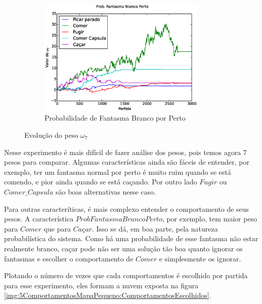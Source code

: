\begin{figure}[H]
	\centering
	\begin{subfigure}[t]{.5\textwidth}
		\centering
		\includegraphics[width=80mm]{images/5_behaviors_small_map/weights____pol__ProbFantasmaBrancoPerto}
		\caption{Probabilidade de Fantasma Branco por Perto}
	\end{subfigure}%
	\caption{Evolução do peso $ \omega_7 $}
	\label{img:5ComportamentosMapaPequeno:PesoProbFantasmaBrancoPorPerto}
\end{figure}

Nesse experimento é mais difícil de fazer análise dos pesos, pois temos agora 7 pesos para comparar. Algumas características ainda são fáceis de entender, por exemplo, ter um fantasma normal por perto é muito ruim quando se está comendo, e pior ainda quando se está caçando. Por outro lado $ Fugir $ ou $ Comer\_Capsula $ são boas alternativas nesse caso.

Para outras caracteríticas, é mais complexo entender o comportamento de seus pesos. A característica $ Prob Fantasma Branco Perto $, por exemplo, tem maior peso para $ Comer $ que para $ \textit{Caçar} $. Isso se dá, em boa parte, pela natureza probabilística do sistema. Como há uma probabilidade de esse fantasma não estar realmente branco, caçar pode não ser uma solução tão boa quanto ignorar os fantasmas e escolher o comportamento de $ Comer $ e simplesmente os ignorar.

Plotando o número de vezes que cada comportamentos é escolhido por partida para esse experimento, eles formam a nuvem exposta na figura \ref{img:5ComportamentosMapaPequeno:ComportamentosEscolhidos}.

